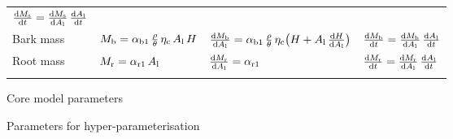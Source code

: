 \documentclass[10pt,twoside]{article}
\begin{document}
\begin{table}[h!]
\begin{tabular}{p{2.5cm}p{3.5cm}p{5cm}p{4cm} }
$\frac{{\rm d}M_{\rm s}}{{\rm d}t} = \frac{{\rm d}M_{\rm s}}{{\rm d}A_{\rm l}} \, \frac{{\rm d}A_{\rm l}}{{\rm d}t}$ \\
Bark mass &
$M_{\rm b} = \alpha_{{\rm b1}} \, \frac{\rho}{\theta} \, \eta_{\rm c} \, A_{\rm l} \, H $ &
$\frac{{\rm d}M_{\rm b}}{{\rm d}A_{\rm l}} = \alpha_{{\rm b1}} \, \frac{\rho}{\theta} \, \eta_{\rm c}\big(H + A_{\rm l} \, \frac{{\rm d}H}{{\rm d}A_{\rm l}} \big)$ &
$\frac{{\rm d}M_{\rm b}}{{\rm d}t} = \frac{{\rm d}M_{\rm b}}{{\rm d}A_{\rm l}} \, \frac{{\rm d}A_{\rm l}}{{\rm d}t}$ \\
Root mass &
$M_{\rm r} = \alpha_{{\rm r1}} \, A_{\rm l}$ &
$\frac{{\rm d}M_{\rm r}}{{\rm d}A_{\rm l}} = \alpha_{{\rm r1}}$ &
$\frac{{\rm d}M_{\rm r}}{{\rm d}t} = \frac{{\rm d}M_{\rm r}}{{\rm d}A_{\rm l}} \, \frac{{\rm d}A_{\rm l}}{{\rm d}t}$ \\
\hline \\
\end{tabular}
\label{tab:allometry}
\end{table}

\newpage

\begin{table}[h!]
\caption{Core model parameters}

\label{tab:params_core}
\end{table}

\begin{table}[h!]
\caption{Parameters for hyper-parameterisation}

\label{tab:params_hyper}
\end{table}

\clearpage


\end{document}
